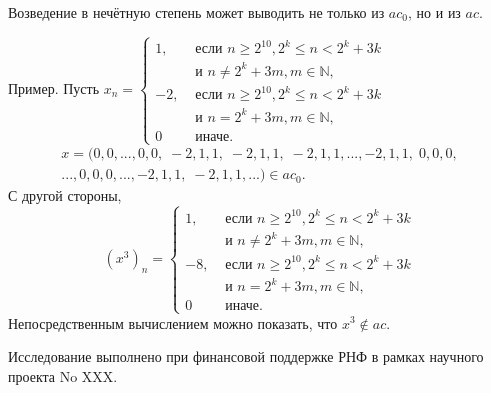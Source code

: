 \documentclass[14pt, a4paper]{extbook}
\begin{document}
Возведение в нечётную степень может выводить не только из $ac_0$,
но и из $ac$.

Пример.
	Пусть
	$
		x_n = \begin{cases}
			 1, & \mbox{~если~} n \ge 2^{10}, 2^k\le n < 2^k+3k
			\\
				& \mbox{~и~}  n\neq 2^k + 3m, m\in\mathbb{N},
			\\
			-2, & \mbox{~если~} n \ge 2^{10}, 2^k\le n < 2^k+3k
			\\
				& \mbox{~и~}  n  =  2^k + 3m, m\in\mathbb{N},
			\\
			 0  & \mbox{~иначе}.
		\end{cases}
	$
	\begin{multline*}
		x = (0,0,...,0,0, \; -2, 1, 1, \; -2, 1, 1, \; -2, 1, 1, ..., -2, 1, 1, \; 0, 0, 0, \\ ..., 0, 0, 0, ..., -2, 1, 1, \; -2, 1, 1, ... ) \in ac_0
		.
	\end{multline*}
	С другой стороны,
		\begin{equation*}
		(x^3)_n = \begin{cases}
			 1, & \mbox{~если~} n \ge 2^{10}, 2^k\le n < 2^k+3k
			\\
				& \mbox{~и~}  n\neq 2^k + 3m, m\in\mathbb{N},
			\\
			-8, & \mbox{~если~} n \ge 2^{10}, 2^k\le n < 2^k+3k
			\\
				& \mbox{~и~}  n  =  2^k + 3m, m\in\mathbb{N},
			\\
			 0  & \mbox{~иначе}.
		\end{cases}
	\end{equation*}
	Непосредственным вычислением можно показать, что $x^3 \notin ac$.





{\small Исследование выполнено при финансовой поддержке РНФ в рамках научного проекта No XXX.} %

\end{document}

